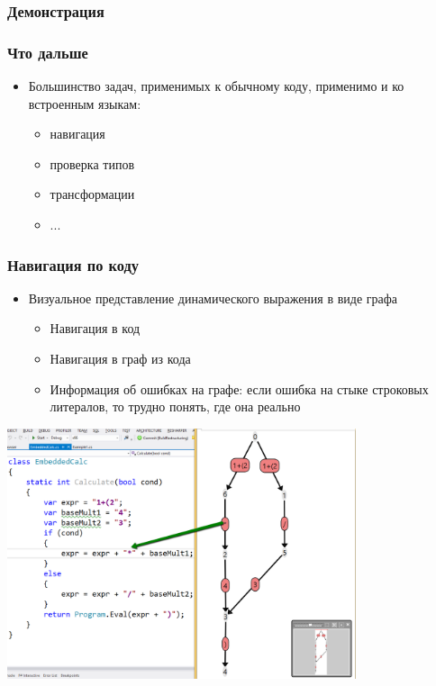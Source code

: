 \documentclass{beamer}
\begin{document}
\begin{frame}[fragile]
	\transwipe[direction=90]
	\frametitle{Демонстрация}
		\begin{center}
		\end{center}
\end{frame}

\begin{frame}[fragile]
	\transwipe[direction=90]
	\frametitle{Что дальше}
	\begin{itemize}
        \item Большинство задач, применимых к обычному коду, применимо и ко встроенным языкам:
        \begin{itemize}
            \item навигация
            \item проверка типов
            \item трансформации
            \item ...
        \end{itemize}
	\end{itemize}
\end{frame}


\begin{frame}[fragile]
	\transwipe[direction=90]
	\frametitle{Навигация по коду}
	\begin{itemize}
        \item Визуальное представление динамического выражения в виде графа
        \begin{itemize}
            \item Навигация в код
            \item Навигация в граф из кода
            \item Информация об ошибках на графе: если ошибка на стыке строковых литералов, то трудно понять, где она реально
        \end{itemize}
	\end{itemize}
	\begin{center}
            \includegraphics[width=290pt]{picts/Navigate2.png}
        \end{center}
\end{frame}
\end{document}
